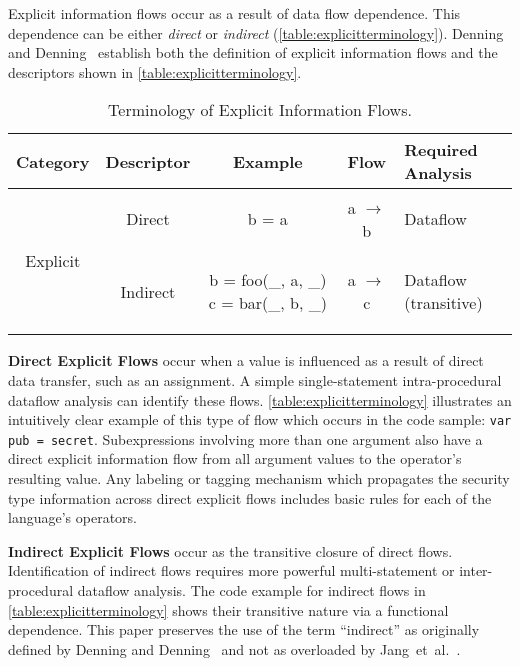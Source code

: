 Explicit information flows occur as a result of data flow dependence.
This dependence can be either \emph{direct} or \emph{indirect} (\autoref{table:explicitterminology}).
Denning and Denning~\cite{denning.denning+77} establish both the definition of explicit information flows and the descriptors shown in \autoref{table:explicitterminology}.

\begin{table*}[h]
\centering
\begin{tabular}{ccccm{2.5cm}}
\toprule
Category & Descriptor & Example & Flow & Required Analysis \\
\midrule[\heavyrulewidth]
\multirow{3}{*}{Explicit} & Direct &
\begin{js-embed}
b = a
\end{js-embed}
& a $\rightarrow$ b & Dataflow\\
\cmidrule(r){2-5} & Indirect &
\begin{js-embed}
b = foo(_, a, _)
c = bar(_, b, _)
\end{js-embed}
& a $\rightarrow$ c & Dataflow (transitive) \\
\bottomrule
\end{tabular}
\caption{Terminology of Explicit Information Flows.}
\label{table:explicitterminology}
\end{table*}

\begin{description}
\item{
\textbf{Direct Explicit Flows} occur when a value is influenced as a result of direct data transfer, such as an assignment.
A simple single-statement intra-procedural dataflow analysis can identify these flows.
\autoref{table:explicitterminology} illustrates an intuitively clear example of this type of flow which occurs in the code sample: \texttt{var pub = secret}.
Subexpressions involving more than one argument also have a direct explicit information flow from all argument values to the operator's resulting value.
Any labeling or tagging mechanism which propagates the security type information across direct explicit flows includes basic rules for each of the language's operators.
}

\item{
\textbf{Indirect Explicit Flows} occur as the transitive closure of direct flows.
Identification of indirect flows requires more powerful multi-statement or inter-procedural dataflow analysis.
The code example for indirect flows in \autoref{table:explicitterminology} shows their transitive nature via a functional dependence.
This paper preserves the use of the term ``indirect'' as originally defined by Denning and Denning~\cite{denning.denning+77} and not as overloaded by Jang~et~al.~\cite{jang.etal+10}.
}
\end{description}

